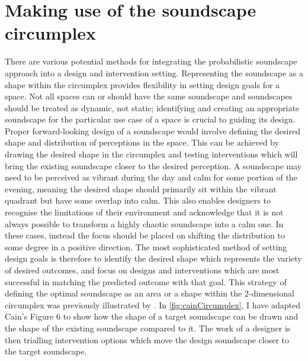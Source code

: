 \section{Making use of the soundscape circumplex}
There are various potential methods for integrating the probabilistic soundscape approach into a design and intervention setting. Representing the soundscape as a shape within the circumplex provides flexibility in setting design goals for a space. Not all spaces can or should have the same soundscape and soundscapes should be treated as dynamic, not static; identifying and creating an appropriate soundscape for the particular use case of a space is crucial to guiding its design. Proper forward-looking design of a soundscape would involve defining the desired shape and distribution of perceptions in the space. This can be achieved by drawing the desired shape in the circumplex and testing interventions which will bring the existing soundscape closer to the desired perception. A soundscape may need to be perceived as vibrant during the day and calm for some portion of the evening, meaning the desired shape should primarily sit within the vibrant quadrant but have some overlap into calm. This also enables designers to recognise the limitations of their environment and acknowledge that it is not always possible to transform a highly chaotic soundscape into a calm one. In these cases, instead the focus should be placed on shifting the distribution to some degree in a positive direction. The most sophisticated method of setting design goals is therefore to identify the desired shape which represents the variety of desired outcomes, and focus on designs and interventions which are most successful in matching the predicted outcome with that goal. This strategy of defining the optimal soundscape as an area or a shape within the 2-dimensional circumplex was previously illustrated by \citet{Cain2013development}. In \cref{fig:cainCircumplex}, I have adapted Cain's Figure 6 to show how the shape of a target soundscape can be drawn and the shape of the existing soundscape compared to it. The work of a designer is then trialling intervention options which move the design soundscape closer to the target soundscape. 

